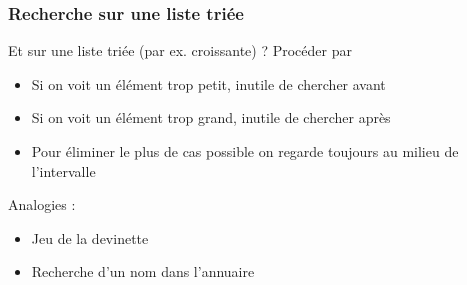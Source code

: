 \documentclass[12pt]{linfo-beamer}
\begin{document}
\begin{frame}
  \frametitle{Recherche sur une liste triée}

  Et sur une liste triée (par ex. croissante) ? Procéder par
  \begin{itemize}
  \item Si on voit un élément trop petit, inutile de chercher avant
  \item Si on voit un élément trop grand, inutile de chercher après
  \item Pour éliminer le plus de cas possible on regarde toujours au
    milieu de l'intervalle
  \end{itemize}

  \vfill

  Analogies :
  \begin{itemize}
  \item Jeu de la devinette
  \item Recherche d'un nom dans l'annuaire
  \end{itemize}

\end{frame}
\end{document}
